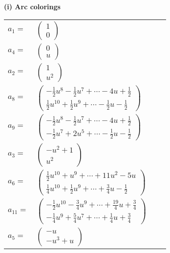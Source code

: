 \documentclass[1p]{elsarticle_modified}
\theoremstyle{definition}
\begin{document}
\flushleft \textbf{(i) Arc colorings}\\
\begin{tabular}{m{7pt} m{180pt} m{7pt} m{180pt} }
\flushright $a_{1}=$&$\begin{pmatrix}1\\0\end{pmatrix}$ \\
\flushright $a_{4}=$&$\begin{pmatrix}0\\u\end{pmatrix}$ \\
\flushright $a_{2}=$&$\begin{pmatrix}1\\u^2\end{pmatrix}$ \\
\flushright $a_{8}=$&$\begin{pmatrix}-\frac{1}{2} u^8-\frac{1}{2} u^7+\cdots-4 u+\frac{1}{2}\\\frac{1}{2} u^{10}+\frac{1}{2} u^9+\cdots-\frac{1}{2} u-\frac{1}{2}\end{pmatrix}$ \\
\flushright $a_{9}=$&$\begin{pmatrix}-\frac{1}{2} u^8-\frac{1}{2} u^7+\cdots-4 u+\frac{1}{2}\\-\frac{1}{2} u^7+2 u^5+\cdots-\frac{1}{2} u-\frac{1}{2}\end{pmatrix}$ \\
\flushright $a_{3}=$&$\begin{pmatrix}- u^2+1\\u^2\end{pmatrix}$ \\
\flushright $a_{6}=$&$\begin{pmatrix}\frac{1}{2} u^{10}+u^9+\cdots+11 u^2-5 u\\\frac{1}{4} u^{10}+\frac{1}{2} u^9+\cdots+\frac{3}{4} u-\frac{1}{2}\end{pmatrix}$ \\
\flushright $a_{11}=$&$\begin{pmatrix}-\frac{1}{2} u^{10}-\frac{3}{4} u^9+\cdots+\frac{19}{4} u+\frac{3}{4}\\-\frac{1}{4} u^9+\frac{5}{4} u^7+\cdots+\frac{1}{4} u+\frac{3}{4}\end{pmatrix}$ \\
\flushright $a_{5}=$&$\begin{pmatrix}- u\\- u^3+u\end{pmatrix}$ \\

\end{tabular}
\end{document}
